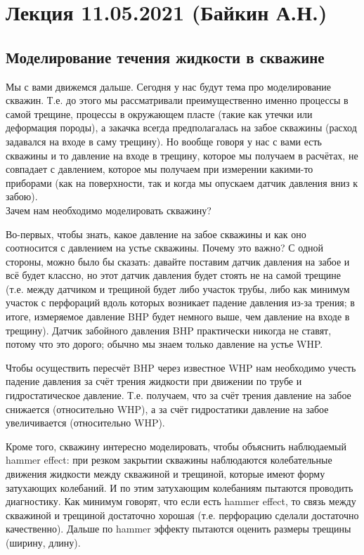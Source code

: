 \documentclass[main.tex]{subfiles}
\begin{document}

\section{Лекция 11.05.2021 (Байкин А.Н.)}

\subsection{Моделирование течения жидкости в скважине}


Мы с вами движемся дальше.
Сегодня у нас будут тема про моделирование скважин.
Т.е. до этого мы рассматривали преимущественно именно процессы в самой трещине, процессы в окружающем пласте (такие как утечки или деформация породы), а закачка всегда предполагалась на забое скважины (расход задавался на входе в саму трещину).
Но вообще говоря у нас с вами есть скважины и то давление на входе в трещину, которое мы получаем в расчётах, не совпадает с давлением, которое мы получаем при измерении какими-то приборами (как на поверхности, так и когда мы опускаем датчик давления вниз к забою).
\\

Зачем нам необходимо моделировать скважину?

Во-первых, чтобы знать, какое давление на забое скважины и как оно соотносится с давлением на устье скважины.
Почему это важно?
С одной стороны, можно было бы сказать: давайте поставим датчик давления на забое и всё будет классно, но этот датчик давления будет стоять не на самой трещине (т.е. между датчиком и трещиной будет либо участок трубы, либо как минимум участок с перфораций вдоль которых возникает падение давления из-за трения; в итоге, измеряемое давление BHP будет немного выше, чем давление на входе в трещину).
Датчик забойного давления BHP практически никогда не ставят, потому что это дорого; обычно мы знаем только давление на устье WHP.

Чтобы осуществить пересчёт BHP через известное WHP нам необходимо учесть падение давления за счёт трения жидкости при движении по трубе и гидростатическое давление.
Т.е. получаем, что за счёт трения давление на забое снижается (относительно WHP), а за счёт гидростатики давление на забое увеличивается (относительно WHP).

Кроме того, скважину интересно моделировать, чтобы объяснить наблюдаемый hammer effect: при резком закрытии скважины наблюдаются колебательные движения жидкости между скважиной и трещиной, которые имеют форму затухающих колебаний.
И по этим затухающим колебаниям пытаются проводить диагностику. Как минимум говорят, что если есть hammer effect, то связь между скважиной и трещиной достаточно хорошая (т.е. перфорацию сделали достаточно качественно).
Дальше по hammer эффекту пытаются оценить размеры трещины (ширину, длину).
\end{document}
